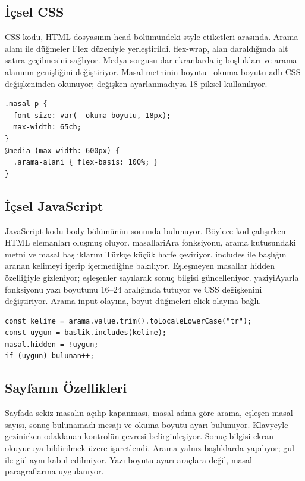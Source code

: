 \documentclass[11pt,a4paper]{article}
\begin{document}
\subsection{İçsel CSS}
CSS kodu, HTML dosyasının head bölümündeki style etiketleri arasında. Arama alanı ile düğmeler Flex düzeniyle yerleştirildi. flex-wrap, alan daraldığında alt satıra geçilmesini sağlıyor. Medya sorgusu dar ekranlarda iç boşlukları ve arama alanının genişliğini değiştiriyor. Masal metninin boyutu --okuma-boyutu adlı CSS değişkeninden okunuyor; değişken ayarlanmadıysa 18 piksel kullanılıyor.

\begin{Verbatim}[fontsize=\small,breaklines=true,frame=single]
.masal p {
  font-size: var(--okuma-boyutu, 18px);
  max-width: 65ch;
}
@media (max-width: 600px) {
  .arama-alani { flex-basis: 100%; }
}
\end{Verbatim}
\subsection{İçsel JavaScript}
JavaScript kodu body bölümünün sonunda bulunuyor. Böylece kod çalışırken HTML elemanları oluşmuş oluyor. masallariAra fonksiyonu, arama kutusundaki metni ve masal başlıklarını Türkçe küçük harfe çeviriyor. includes ile başlığın aranan kelimeyi içerip içermediğine bakılıyor. Eşleşmeyen masallar hidden özelliğiyle gizleniyor; eşleşenler sayılarak sonuç bilgisi güncelleniyor. yaziyiAyarla fonksiyonu yazı boyutunu 16–24 aralığında tutuyor ve CSS değişkenini değiştiriyor. Arama input olayına, boyut düğmeleri click olayına bağlı.

\begin{Verbatim}[fontsize=\small,breaklines=true,frame=single]
const kelime = arama.value.trim().toLocaleLowerCase("tr");
const uygun = baslik.includes(kelime);
masal.hidden = !uygun;
if (uygun) bulunan++;
\end{Verbatim}
\subsection{Sayfanın Özellikleri}
Sayfada sekiz masalın açılıp kapanması, masal adına göre arama, eşleşen masal sayısı, sonuç bulunamadı mesajı ve okuma boyutu ayarı bulunuyor. Klavyeyle gezinirken odaklanan kontrolün çevresi belirginleşiyor. Sonuç bilgisi ekran okuyucuya bildirilmek üzere işaretlendi. Arama yalnız başlıklarda yapılıyor; gul ile gül aynı kabul edilmiyor. Yazı boyutu ayarı araçlara değil, masal paragraflarına uygulanıyor.
\end{document}
